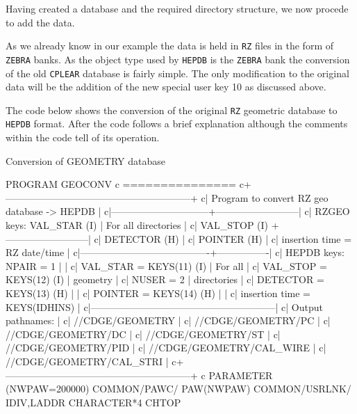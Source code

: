 Having created a database and the required directory structure, we now procede
to add the data.

As we already know in our example the data is held in {\tt RZ} files in the form of
{\tt ZEBRA} banks. As the object type used by {\tt HEPDB} is the {\tt ZEBRA} bank
the conversion of the old {\tt CPLEAR} database is fairly simple.
The only modification to the
original data will be the addition of the new special user key 10 as discussed
above.

The code below shows the conversion of the original {\tt RZ} geometric database to
{\tt HEPDB} format. After the code follows a brief explanation although the comments
within the code tell of its operation.
%
\begin{XMPt}{Conversion of GEOMETRY database}

      PROGRAM GEOCONV
c     ===============
c+---------------------------------------------------------+
c|    Program to convert    RZ  geo database -> HEPDB      |
c|------------------------------+--------------------------|
c|    RZGEO keys: VAL_STAR (I)  |  For all directories     |
c|                VAL_STOP (I)  +--------------------------|
c|                DETECTOR (H)                             |
c|                POINTER  (H)                             |
c|    insertion time = RZ date/time                        |
c|----------------------------------------+----------------|
c|    HEPDB keys: NPAIR    = 1            |                |
c|                VAL_STAR = KEYS(11) (I) | For all        |
c|                VAL_STOP = KEYS(12) (I) | geometry       |
c|                NUSER    = 2            | directories    |
c|                DETECTOR = KEYS(13) (H) |                |
c|                POINTER  = KEYS(14) (H) |                |
c|    insertion time = KEYS(IDHINS)                        |
c|---------------------------------------------------------|
c|    Output pathnames:                                    |
c|    //CDGE/GEOMETRY                                      |
c|    //CDGE/GEOMETRY/PC                                   |
c|    //CDGE/GEOMETRY/DC                                   |
c|    //CDGE/GEOMETRY/ST                                   |
c|    //CDGE/GEOMETRY/PID                                  |
c|    //CDGE/GEOMETRY/CAL_WIRE                             |
c|    //CDGE/GEOMETRY/CAL_STRI                             |
c+---------------------------------------------------------+
c
      PARAMETER     (NWPAW=200000)
      COMMON/PAWC/   PAW(NWPAW)
      COMMON/USRLNK/ IDIV,LADDR
      CHARACTER*4    CHTOP

\end{XMPt}
